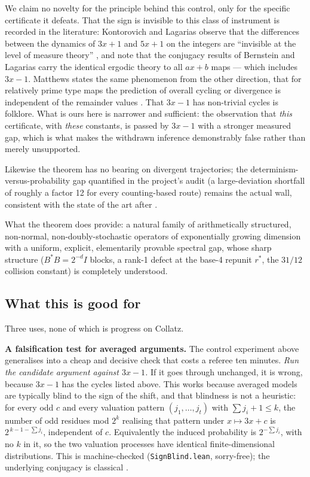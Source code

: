 \documentclass[12pt,a4paper]{article}
\begin{document}
We claim no novelty for the principle behind this control, only for the specific certificate it
defeats. That the sign is invisible to this class of instrument is recorded in the literature:
Kontorovich and Lagarias observe that the differences between the dynamics of $3x+1$ and $5x+1$
on the integers are ``invisible at the level of measure theory'' \cite{KontorovichLagarias2010},
and note that the conjugacy results of Bernstein and Lagarias \cite{BernsteinLagarias1996} carry
the identical ergodic theory to all $ax+b$ maps --- which includes $3x-1$. Matthews states the
same phenomenon from the other direction, that for relatively prime type maps the prediction of
overall cycling or divergence is independent of the remainder values \cite{Matthews2010}. That
$3x-1$ has non-trivial cycles is folklore. What is ours here is narrower and sufficient: the
observation that \emph{this} certificate, with \emph{these} constants, is passed by $3x-1$ with a
stronger measured gap, which is what makes the withdrawn inference demonstrably false rather than
merely unsupported.

Likewise the theorem has
no bearing on divergent trajectories; the determinism-versus-probability gap quantified in the
project's audit (a large-deviation shortfall of roughly a factor 12 for every counting-based
route) remains the actual wall, consistent with the state of the art after \cite{Tao2019}.

What the theorem does provide: a natural family of arithmetically structured, non-normal,
non-doubly-stochastic operators of exponentially growing dimension with a uniform, explicit,
elementarily provable spectral gap, whose sharp structure ($B^\ast B = 2^{-d} I$ blocks, a rank-1
defect at the base-4 repunit $r^\ast$, the $31/12$ collision constant) is completely understood.

\subsection*{What this is good for}

Three uses, none of which is progress on Collatz.

\textbf{A falsification test for averaged arguments.} The control experiment above generalises
into a cheap and decisive check that costs a referee ten minutes. \emph{Run the candidate
argument against $3x - 1$.} If it goes through unchanged, it is wrong, because $3x-1$ has the
cycles listed above. This works because averaged models are typically blind to the sign of the
shift, and that blindness is not a heuristic: for every odd $c$ and every valuation pattern
$(j_1, \dots, j_t)$ with $\sum j_i + 1 \leq k$, the number of odd residues mod $2^k$ realising
that pattern under $x \mapsto 3x + c$ is $2^{\,k-1-\sum j_i}$, independent of $c$. Equivalently
the induced probability is $2^{-\sum j_i}$, with no $k$ in it, so the two valuation processes
have identical finite-dimensional distributions. This is machine-checked (\texttt{SignBlind.lean},
sorry-free); the underlying conjugacy is classical \cite{BernsteinLagarias1996, Lagarias1985}.
\end{document}

